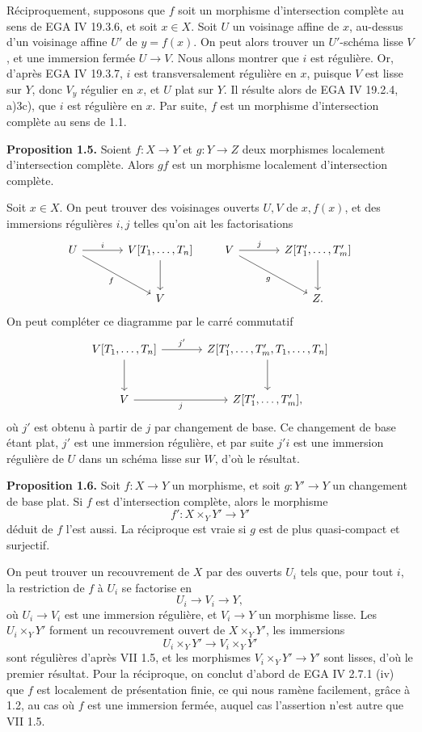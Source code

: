 \documentclass[11pt]{article}
\begin{document}
Réciproquement, supposons que $f$ soit un morphisme d'intersection complète au sens de EGA IV 19.3.6, et soit $x\in X$. Soit $U$ un voisinage affine de $x$, au-dessus d'un voisinage affine $U'$ de $y=f(x)$. On peut alors trouver un $U'$-schéma lisse $V$, et une immersion fermée $U\to V$. Nous allons montrer que $i$ est régulière. Or, d'après EGA IV 19.3.7, $i$ est transversalement régulière en $x$, puisque $V$ est lisse sur $Y$, donc $V_y$ régulier en $x$, et $U$ plat sur $Y$. Il résulte alors de EGA IV 19.2.4, a)3c), que $i$ est régulière en $x$. Par suite, $f$ est un morphisme d'intersection complète au sens de 1.1.

\textbf{Proposition 1.5.} Soient $f:X\to Y$ et $g:Y\to Z$ deux morphismes localement d'intersection complète. Alors $gf$ est un morphisme localement d'intersection complète.

Soit $x\in X$. On peut trouver des voisinages ouverts $U,V$ de $x,f(x)$, et des immersions régulières $i,j$ telles qu'on ait les factorisations
\[
\begin{tikzcd}[column sep=large,row sep=large]
U \arrow[r,"i"] \arrow[dr,"f"'] & V[T_1,\ldots,T_n] \arrow[d]\\
& V
\end{tikzcd}
\qquad
\begin{tikzcd}[column sep=large,row sep=large]
V \arrow[r,"j"] \arrow[dr,"g"'] & Z[T'_1,\ldots,T'_m] \arrow[d]\\
& Z.
\end{tikzcd}
\]
On peut compléter ce diagramme par le carré commutatif
\[
\begin{tikzcd}[column sep=large,row sep=large]
V[T_1,\ldots,T_n] \arrow[r,"j'"] \arrow[d] & Z[T'_1,\ldots,T'_m,T_1,\ldots,T_n] \arrow[d]\\
V \arrow[r,"j"'] & Z[T'_1,\ldots,T'_m],
\end{tikzcd}
\]
où $j'$ est obtenu à partir de $j$ par changement de base. Ce changement de base étant plat, $j'$ est une immersion régulière, et par suite $j'i$ est une immersion régulière de $U$ dans un schéma lisse sur $W$, d'où le résultat.

\textbf{Proposition 1.6.} Soit $f:X\to Y$ un morphisme, et soit $g:Y'\to Y$ un changement de base plat. Si $f$ est d'intersection complète, alors le morphisme
\[
f':X\times_Y Y'\to Y'
\]
déduit de $f$ l'est aussi. La réciproque est vraie si $g$ est de plus quasi-compact et surjectif.

On peut trouver un recouvrement de $X$ par des ouverts $U_i$ tels que, pour tout $i$, la restriction de $f$ à $U_i$ se factorise en
\[
U_i\longrightarrow V_i\longrightarrow Y,
\]
où $U_i\to V_i$ est une immersion régulière, et $V_i\to Y$ un morphisme lisse. Les $U_i\times_Y Y'$ forment un recouvrement ouvert de $X\times_Y Y'$, les immersions
\[
U_i\times_Y Y'\longrightarrow V_i\times_Y Y'
\]
sont régulières d'après VII 1.5, et les morphismes $V_i\times_Y Y'\to Y'$ sont lisses, d'où le premier résultat. Pour la réciproque, on conclut d'abord de EGA IV 2.7.1 (iv) que $f$ est localement de présentation finie, ce qui nous ramène facilement, grâce à 1.2, au cas où $f$ est une immersion fermée, auquel cas l'assertion n'est autre que VII 1.5.
\end{document}
